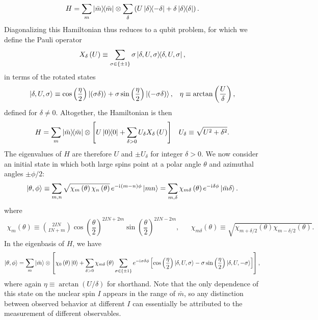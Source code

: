 \documentclass[nofootinbib,notitlepage,11pt]{revtex4-2}
\newcommand{\f}[2]{\dfrac{#1}{#2}} %
\newcommand{\p}[1]{\left(#1\right)} %
\renewcommand{\sp}[1]{\left[#1\right]} %
\renewcommand{\set}[1]{\left\{#1\right\}} %
\renewcommand{\i}{\mathrm{i}\mkern1mu} %
\newcommand{\1}{\mathds{1}}
\begin{document}
\begin{align}
  H = \sum_m \op{\bar m} \otimes
  \sum_\delta \p{U \op{\delta}{-\delta} + \delta \op{\delta}}.
\end{align}
Diagonalizing this Hamiltonian thus reduces to a qubit problem, for which we define the Pauli operator
\begin{align}
  X_\delta\p{U} \equiv \sum_{\sigma\in\set{\pm1}}
  \sigma \op{\delta,U,\sigma},
\end{align}
in terms of the rotated states
\begin{align}
  \ket{\delta,U,\sigma} \equiv \cos\p{\f{\eta}{2}} \ket{\p{\sigma\delta}}
  + \sigma \sin\p{\f{\eta}{2}} \ket{\p{-\sigma\delta}},
  &&
  \eta \equiv \arctan\p{\f{U}{\delta}},
\end{align}
defined for $\delta\ne0$.
Altogether, the Hamiltonian is then
\begin{align}
  H = \sum_m \op{\bar m} \otimes
  \sp{U \op{0} + \sum_{\delta>0} U_\delta X_\delta\p{U}}
  &&
  U_\delta \equiv \sqrt{U^2+\delta^2}.
\end{align}
The eigenvalues of $H$ are therefore $U$ and $\pm U_\delta$ for integer $\delta>0$.
We now consider an initial state in which both large spins point at a polar angle $\theta$ and azimuthal angles $\pm\phi/2$:
\begin{align}
  \ket{\theta,\phi} \equiv \sum_{m,n}
  \sqrt{\chi_m\p{\theta} \chi_n\p{\theta}} \,
  e^{-\i\p{m-n}\phi} \ket{mn}
  = \sum_{m,\delta}
  \chi_{m\delta}\p{\theta} e^{-\i\delta\phi}
  \ket{\bar m\delta}.
\end{align}
where
\begin{align}
  \chi_m\p\theta \equiv { 2IN \choose IN + m }
  \cos\p{\f{\theta}{2}}^{2IN+2m} \sin\p{\f{\theta}{2}}^{2IN-2m},
  &&
  \chi_{m\delta}\p\theta
  \equiv \sqrt{\chi_{m+\delta/2}\p\theta \chi_{m-\delta/2}\p\theta}.
\end{align}
In the eigenbasis of $H$, we have
\begin{align}
  \ket{\theta,\phi} = \sum_m \ket{\bar m} \otimes
  \sp{\chi_0\p\theta \ket{0}
    + \sum_{\delta>0} \chi_{m\delta}\p\theta
    \sum_{\sigma\in\set{\pm1}} e^{-\i\sigma\delta\phi}
    \sp{\cos\p{\f{\eta}{2}} \ket{\delta,U,\sigma}
    - \sigma\sin\p{\f{\eta}{2}} \ket{\delta,U,-\sigma}}},
\end{align}
where again $\eta\equiv\arctan\p{U/\delta}$ for shorthand.
Note that the only dependence of this state on the nuclear spin $I$ appears in the range of $\bar m$, so any distinction between observed behavior at different $I$ can essentially be attributed to the measurement of different observables.
\end{document}

